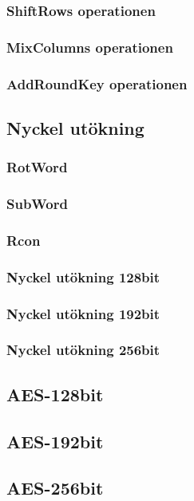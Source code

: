 \subsubsection{ShiftRows operationen}
\label{sec:aes-shiftrows}


\subsubsection{MixColumns operationen}
\label{sec:aes-mixcolumns}


\subsubsection{AddRoundKey operationen}
\label{sec:aes-addroundkey}


\subsection{Nyckel utökning}
\label{sec:aes-key-expansion}


\subsubsection{RotWord}
\label{sec:aes-rotword}


\subsubsection{SubWord}
\label{sec:aes-subword}


\subsubsection{Rcon}
\label{sec:aes-rcon}


\subsubsection{Nyckel utökning 128bit}
\label{sec:aes-key-expansion-128bit}


\subsubsection{Nyckel utökning 192bit}
\label{sec:aes-key-expansion-192bit}


\subsubsection{Nyckel utökning 256bit}
\label{sec:aes-key-expansion-256bit}


\subsection{AES-128bit}
\label{sec:aes-128bit}


\subsection{AES-192bit}
\label{sec:aes-192bit}


\subsection{AES-256bit}
\label{sec:aes-256bit}

